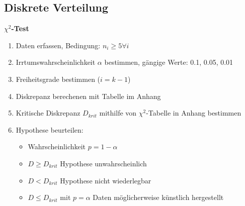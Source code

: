 \documentclass[margin=normal]{tex/hsrzf}
\begin{document}
\begin{minipage}{0.49\textwidth}
    \subsection{Diskrete Verteilung}
    \textbf{$\chi^2$-Test}
    \begin{enumerate}
        \item Daten erfassen, Bedingung: $n_{i} \geq 5 \forall i$
        \item Irrtumswahrscheinlichkeit $\alpha$ bestimmen,
              \newline gängige Werte: 0.1, 0.05, 0.01
        \item Freiheitsgrade bestimmen ($i = k-1$)
        \item Diskrepanz berechenen mit Tabelle im Anhang
        \item Kritische Diskrepanz $D_{krit}$ mithilfe von $\chi^2$-Tabelle in Anhang bestimmen
        \item Hypothese beurteilen:
              \begin{itemize}
                  \item Wahrscheinlichkeit $p= 1- \alpha$
                  \item $D \geq D_{krit}$ Hypothese unwahrscheinlich
                  \item $D < D_{krit}$ Hypothese nicht wiederlegbar
                  \item $D \leq D_{krit}$  mit $p= \alpha$
                        \newline Daten möglicherweise künstlich hergestellt
              \end{itemize}
    \end{enumerate}
\end{minipage}
\\[30pt]
\end{document}
